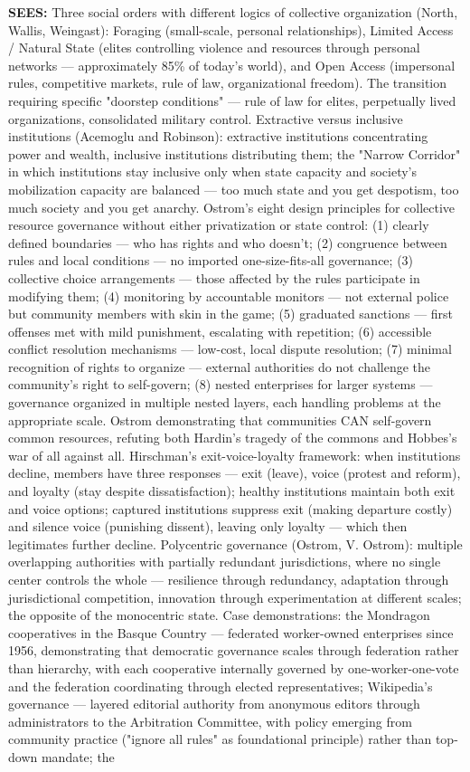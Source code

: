 \textbf{SEES:} Three social orders with different logics of collective organization (North, Wallis, Weingast): Foraging (small-scale, personal relationships), Limited Access / Natural State (elites controlling violence and resources through personal networks — approximately 85\% of today's world), and Open Access (impersonal rules, competitive markets, rule of law, organizational freedom). The transition requiring specific "doorstep conditions" — rule of law for elites, perpetually lived organizations, consolidated military control. Extractive versus inclusive institutions (Acemoglu and Robinson): extractive institutions concentrating power and wealth, inclusive institutions distributing them; the "Narrow Corridor" in which institutions stay inclusive only when state capacity and society's mobilization capacity are balanced — too much state and you get despotism, too much society and you get anarchy. Ostrom's eight design principles for collective resource governance without either privatization or state control: (1) clearly defined boundaries — who has rights and who doesn't; (2) congruence between rules and local conditions — no imported one-size-fits-all governance; (3) collective choice arrangements — those affected by the rules participate in modifying them; (4) monitoring by accountable monitors — not external police but community members with skin in the game; (5) graduated sanctions — first offenses met with mild punishment, escalating with repetition; (6) accessible conflict resolution mechanisms — low-cost, local dispute resolution; (7) minimal recognition of rights to organize — external authorities do not challenge the community's right to self-govern; (8) nested enterprises for larger systems — governance organized in multiple nested layers, each handling problems at the appropriate scale. Ostrom demonstrating that communities CAN self-govern common resources, refuting both Hardin's tragedy of the commons and Hobbes's war of all against all. Hirschman's exit-voice-loyalty framework: when institutions decline, members have three responses — exit (leave), voice (protest and reform), and loyalty (stay despite dissatisfaction); healthy institutions maintain both exit and voice options; captured institutions suppress exit (making departure costly) and silence voice (punishing dissent), leaving only loyalty — which then legitimates further decline. Polycentric governance (Ostrom, V. Ostrom): multiple overlapping authorities with partially redundant jurisdictions, where no single center controls the whole — resilience through redundancy, adaptation through jurisdictional competition, innovation through experimentation at different scales; the opposite of the monocentric state. Case demonstrations: the Mondragon cooperatives in the Basque Country — federated worker-owned enterprises since 1956, demonstrating that democratic governance scales through federation rather than hierarchy, with each cooperative internally governed by one-worker-one-vote and the federation coordinating through elected representatives; Wikipedia's governance — layered editorial authority from anonymous editors through administrators to the Arbitration Committee, with policy emerging from community practice ("ignore all rules" as foundational principle) rather than top-down mandate; the 